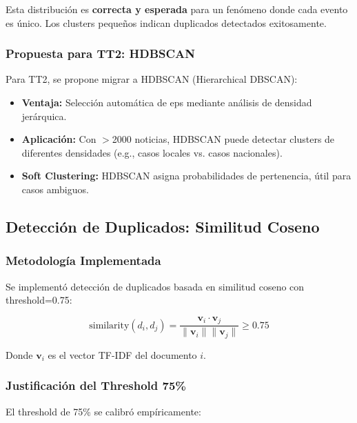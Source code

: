 Esta distribución es \textbf{correcta y esperada} para un fenómeno donde cada evento es único. Los clusters pequeños indican duplicados detectados exitosamente.

\subsubsection{Propuesta para TT2: HDBSCAN}
\label{subsubsec:hdbscan_tt2}

Para TT2, se propone migrar a HDBSCAN (Hierarchical DBSCAN):

\begin{itemize}
    \item \textbf{Ventaja:} Selección automática de eps mediante análisis de densidad jerárquica.
    \item \textbf{Aplicación:} Con $>$2000 noticias, HDBSCAN puede detectar clusters de diferentes densidades (e.g., casos locales vs. casos nacionales).
    \item \textbf{Soft Clustering:} HDBSCAN asigna probabilidades de pertenencia, útil para casos ambiguos.
\end{itemize}

\subsection{Detección de Duplicados: Similitud Coseno}
\label{subsec:duplicados}

\subsubsection{Metodología Implementada}
\label{subsubsec:metodologia_duplicados}

Se implementó detección de duplicados basada en similitud coseno con threshold=0.75:

\begin{equation}
\text{similarity}(d_i, d_j) = \frac{\mathbf{v}_i \cdot \mathbf{v}_j}{\|\mathbf{v}_i\| \|\mathbf{v}_j\|} \geq 0.75
\end{equation}

Donde $\mathbf{v}_i$ es el vector TF-IDF del documento $i$.

\subsubsection{Justificación del Threshold 75\%}
\label{subsubsec:threshold_justificacion}

El threshold de 75\% se calibró empíricamente:

